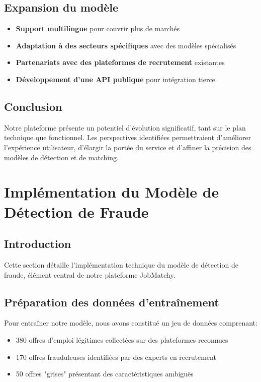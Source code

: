 \documentclass[10pt,a4paper,twocolumn]{article}
\begin{document}
\subsection{Expansion du modèle}
\begin{itemize}
    \item \textbf{Support multilingue} pour couvrir plus de marchés
    \item \textbf{Adaptation à des secteurs spécifiques} avec des modèles spécialisés
    \item \textbf{Partenariats avec des plateformes de recrutement} existantes
    \item \textbf{Développement d'une API publique} pour intégration tierce
\end{itemize}

\subsection{Conclusion}
Notre plateforme présente un potentiel d'évolution significatif, tant sur le plan technique que fonctionnel. Les perspectives identifiées permettraient d'améliorer l'expérience utilisateur, d'élargir la portée du service et d'affiner la précision des modèles de détection et de matching.

\section{Implémentation du Modèle de Détection de Fraude}
\subsection{Introduction}
Cette section détaille l'implémentation technique du modèle de détection de fraude, élément central de notre plateforme JobMatchy.

\subsection{Préparation des données d'entraînement}
Pour entraîner notre modèle, nous avons constitué un jeu de données comprenant:
\begin{itemize}
    \item 380 offres d'emploi légitimes collectées sur des plateformes reconnues
    \item 170 offres frauduleuses identifiées par des experts en recrutement
    \item 50 offres "grises" présentant des caractéristiques ambiguës
\end{itemize}
\end{document}
